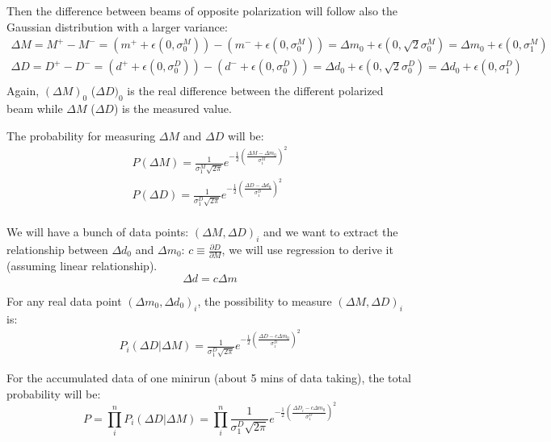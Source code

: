 Then the difference between beams of opposite polarization will follow also
the Gaussian distribution with a larger variance:
\begin{equation*}
    \begin{gathered}
	\Delta M = M^+ - M^- = (m^+ + \epsilon(0, \sigma_0^M)) - (m^- + \epsilon(0, \sigma_0^M))
	    = \Delta m_0 + \epsilon(0, \sqrt{2}\sigma_0^M)
	    = \Delta m_0 + \epsilon(0, \sigma_1^M) \\
	\Delta D = D^+ - D^- = (d^+ + \epsilon(0, \sigma_0^D)) - (d^- + \epsilon(0, \sigma_0^D))
	    = \Delta d_0 + \epsilon(0, \sqrt{2}\sigma_0^D)
	    = \Delta d_0 + \epsilon(0, \sigma_1^D) \\
    \end{gathered}
\end{equation*}
Again, $(\Delta M)_0$ ($\Delta D)_0$ is the real difference between the
different polarized beam while $\Delta M$ ($\Delta D$) is the measured value.

The probability for measuring $\Delta M$ and $\Delta D$ will be:
\begin{equation*}
    \begin{gathered}
	P(\Delta M) = \frac{1}{\sigma_1^M\sqrt{2\pi}} e^{-\frac{1}{2}\left( \frac{\Delta M - \Delta m_0}{\sigma_1^M}\right)^2}    \\
	P(\Delta D) = \frac{1}{\sigma_1^D\sqrt{2\pi}} e^{-\frac{1}{2}\left( \frac{\Delta D - \Delta d_0}{\sigma_1^D}\right)^2}    \\
    \end{gathered}
\end{equation*}

We will have a bunch of data points: $(\Delta M, \Delta D)_i$ and we want to
extract the relationship between $\Delta d_0$ and $\Delta m_0$: $c \equiv \frac{\partial D}{\partial M}$,
we will use regression to derive it (assuming linear relationship).
$$ \Delta d = c \Delta m $$

For any real data point $(\Delta m_0, \Delta d_0)_i$, the possibility to measure
$(\Delta M, \Delta D)_i$ is:
\begin{equation*}
    \begin{gathered}
	P_i(\Delta D|\Delta M) = \frac{1}{\sigma_1^D\sqrt{2\pi}} 
	    e^{-\frac{1}{2}\left( \frac{\Delta D - c\Delta m_0}{\sigma_1^D}\right)^2}
    \end{gathered}
\end{equation*}

For the accumulated data of one minirun (about 5 mins of data taking), the total
probability will be:
\begin{equation*}
    P = \prod_i^n P_i(\Delta D|\Delta M) = \prod_i^n \frac{1}{\sigma_1^D\sqrt{2\pi}} 
	    e^{-\frac{1}{2}\left( \frac{\Delta D_i - c\Delta m_0}{\sigma_1^D}\right)^2}
\end{equation*}



